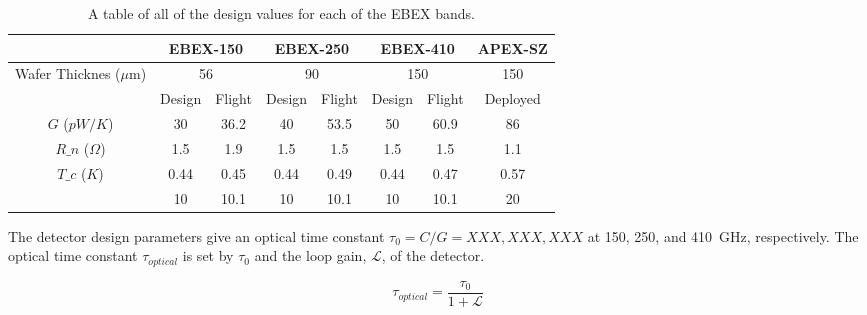 \documentclass[../EBEXPaper2.tex]{subfiles}
\begin{document}
\begin{table}[ht!]
\centering
\footnotesize
\begin{tabular}{| c | c c | c c | c c | c |}
    \multicolumn{1}{c}{}& \multicolumn{2}{c}{EBEX-150} & \multicolumn{2}{c}{EBEX-250} & \multicolumn{2}{c}{EBEX-410} & \multicolumn{1}{c}{APEX-SZ} \\
\hline
\multicolumn{1}{|c|}{Wafer Thicknes ($\mu$m)}   & \multicolumn{2}{|c|}{56}  & \multicolumn{2}{|c|}{90}  & \multicolumn{2}{|c|}{150}  & 150 \\
\hline
 & Design & Flight & Design & Flight & Design & Flight & Deployed \\
\hline
$G$ ($pW/K$)                & 30   & 36.2 & 40   & 53.5 & 50   & 60.9 & 86   \\
$R\_n$ ($\Omega$)          & 1.5  & 1.9  & 1.5  & 1.5  & 1.5  & 1.5  & 1.1  \\
$T\_c$ ($K $)             & 0.44 & 0.45 & 0.44 & 0.49 & 0.44 & 0.47 & 0.57 \\
\color{red}{$\tau_0$ (ms)}  & 10   & 10.1 & 10   & 10.1 & 10   & 10.1 & 20   \\
\hline
\end{tabular}
\caption{A table of all of the design values for each of the \ac{EBEX} bands. \label{tab:Design_Params}}
\end{table}

\normalsize

The detector design parameters give an optical time constant $\tau_{0} = C/G = XXX, XXX, XXX$ at 150, 250, and 410~GHz, respectively. The optical 
time constant $\tau_{optical}$ is set by $\tau_{0}$ and the loop gain, $\mathcal{L}$, of the detector.

\begin{equation}
\tau_{optical}=\frac{\tau_0}{1 + \mathcal{L}}
\end{equation}

\end{document}
